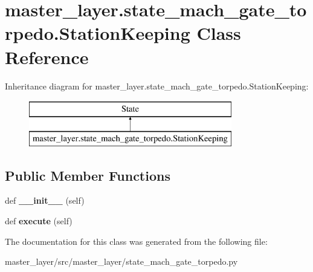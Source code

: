 \hypertarget{classmaster__layer_1_1state__mach__gate__torpedo_1_1StationKeeping}{}\section{master\+\_\+layer.\+state\+\_\+mach\+\_\+gate\+\_\+torpedo.\+Station\+Keeping Class Reference}
\label{classmaster__layer_1_1state__mach__gate__torpedo_1_1StationKeeping}
Inheritance diagram for master\+\_\+layer.\+state\+\_\+mach\+\_\+gate\+\_\+torpedo.\+Station\+Keeping\+:\begin{figure}[H]
\begin{center}
\leavevmode
\includegraphics[height=2.000000cm]{classmaster__layer_1_1state__mach__gate__torpedo_1_1StationKeeping}
\end{center}
\end{figure}
\subsection*{Public Member Functions}
\begin{DoxyCompactItemize}
\item 
\mbox{\label{classmaster__layer_1_1state__mach__gate__torpedo_1_1StationKeeping_a18ee447bbfa41a55f5493aff92873023}} 
def {\bfseries \+\_\+\+\_\+init\+\_\+\+\_\+} (self)
\item 
\mbox{\label{classmaster__layer_1_1state__mach__gate__torpedo_1_1StationKeeping_a8807695d2dae048ea6a208a8f35a11e5}} 
def {\bfseries execute} (self)
\end{DoxyCompactItemize}


The documentation for this class was generated from the following file\+:\begin{DoxyCompactItemize}
\item 
master\+\_\+layer/src/master\+\_\+layer/state\+\_\+mach\+\_\+gate\+\_\+torpedo.\+py\end{DoxyCompactItemize}

